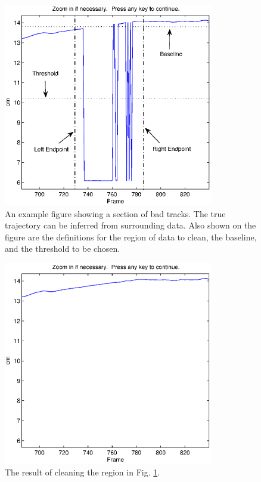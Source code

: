 \documentclass[letterpaper, 11pt]{article}
\begin{document}
\begin{figure}[p]
 \centering
\includegraphics[clip=true, height = 3.5in]{ExDirtyRegion.eps}
\caption{An example figure showing a section of bad tracks.  The
true trajectory can be inferred from surrounding data.  Also shown
on the figure are the definitions for the region of data to clean,
the baseline, and the threshold to be chosen.}
 \label{ExDirtyRegion}
\end{figure}
\begin{figure}[p]
 \centering
\includegraphics[clip=true, height = 3.5in]{ExCleanRegion.eps}
\caption{The result of cleaning the region in Fig.
\ref{ExDirtyRegion}.} \label{ExCleanRegion}
\end{figure}
\end{document}

